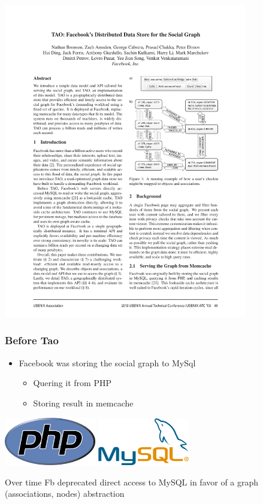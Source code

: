 \begin{frame}[t]
\begin{center}
\includegraphics[width=0.8\textwidth]{figs/social2}	
\end{center}


\end{frame}

\begin{frame}
\frametitle{Before Tao}
	\begin{itemize}
 	\item Facebook was storing the social graph to MySql
	\begin{itemize}
		\item  	Quering it from PHP
		\item  	Storing result in memcache\\
	\end{itemize}
	\end{itemize}
	\begin{center}
		\includegraphics[width=0.3\textwidth]{figs/php-logo.eps}\quad
		\includegraphics[width=0.3\textwidth]{figs/mysql.png}
	\end{center}
 	Over time Fb deprecated direct access to MySQL in favor of a graph (associations, nodes) abstraction
\end{frame}

